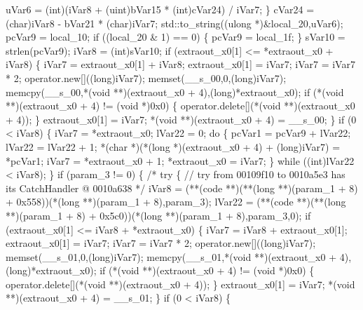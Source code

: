 \documentclass[
]{article}
\newenvironment{Shaded}{}{}
\newcommand{\NormalTok}[1]{#1}
\begin{document}
\begin{Shaded}
\begin{Highlighting}[]
\NormalTok{    uVar6 = (int)(iVar8 + (uint)bVar15 * (int)cVar24) / iVar7;}
\NormalTok{  \}}
\NormalTok{  cVar24 = (char)iVar8 {-} bVar21 * (char)iVar7;}
\NormalTok{  std::to\_string((ulong *)\&local\_20,uVar6);}
\NormalTok{  pcVar9 = local\_10;}
\NormalTok{  if ((local\_20 \& 1) == 0) \{}
\NormalTok{    pcVar9 = local\_1f;}
\NormalTok{  \}}
\NormalTok{  sVar10 = strlen(pcVar9);}
\NormalTok{  iVar8 = (int)sVar10;}
\NormalTok{  if (extraout\_x0[1] \textless{}= *extraout\_x0 + iVar8) \{}
\NormalTok{    iVar7 = extraout\_x0[1] + iVar8;}
\NormalTok{    extraout\_x0[1] = iVar7;}
\NormalTok{    iVar7 = iVar7 * 2;}
\NormalTok{    operator.new[]((long)iVar7);}
\NormalTok{    memset(\_\_s\_00,0,(long)iVar7);}
\NormalTok{    memcpy(\_\_s\_00,*(void **)(extraout\_x0 + 4),(long)*extraout\_x0);}
\NormalTok{    if (*(void **)(extraout\_x0 + 4) != (void *)0x0) \{}
\NormalTok{      operator.delete[](*(void **)(extraout\_x0 + 4));}
\NormalTok{    \}}
\NormalTok{    extraout\_x0[1] = iVar7;}
\NormalTok{    *(void **)(extraout\_x0 + 4) = \_\_s\_00;}
\NormalTok{  \}}
\NormalTok{  if (0 \textless{} iVar8) \{}
\NormalTok{    iVar7 = *extraout\_x0;}
\NormalTok{    lVar22 = 0;}
\NormalTok{    do \{}
\NormalTok{      pcVar1 = pcVar9 + lVar22;}
\NormalTok{      lVar22 = lVar22 + 1;}
\NormalTok{      *(char *)(*(long *)(extraout\_x0 + 4) + (long)iVar7) = *pcVar1;}
\NormalTok{      iVar7 = *extraout\_x0 + 1;}
\NormalTok{      *extraout\_x0 = iVar7;}
\NormalTok{    \} while ((int)lVar22 \textless{} iVar8);}
\NormalTok{  \}}
\NormalTok{  if (param\_3 != 0) \{}
\NormalTok{                    /* try \{ // try from 00109f10 to 0010a5e3 has its CatchHandler @ 0010a638 */}
\NormalTok{    iVar8 = (**(code **)(**(long **)(param\_1 + 8) + 0x558))(*(long **)(param\_1 + 8),param\_3);}
\NormalTok{    lVar22 = (**(code **)(**(long **)(param\_1 + 8) + 0x5c0))(*(long **)(param\_1 + 8),param\_3,0);}
\NormalTok{    if (extraout\_x0[1] \textless{}= iVar8 + *extraout\_x0) \{}
\NormalTok{      iVar7 = iVar8 + extraout\_x0[1];}
\NormalTok{      extraout\_x0[1] = iVar7;}
\NormalTok{      iVar7 = iVar7 * 2;}
\NormalTok{      operator.new[]((long)iVar7);}
\NormalTok{      memset(\_\_s\_01,0,(long)iVar7);}
\NormalTok{      memcpy(\_\_s\_01,*(void **)(extraout\_x0 + 4),(long)*extraout\_x0);}
\NormalTok{      if (*(void **)(extraout\_x0 + 4) != (void *)0x0) \{}
\NormalTok{        operator.delete[](*(void **)(extraout\_x0 + 4));}
\NormalTok{      \}}
\NormalTok{      extraout\_x0[1] = iVar7;}
\NormalTok{      *(void **)(extraout\_x0 + 4) = \_\_s\_01;}
\NormalTok{    \}}
\NormalTok{    if (0 \textless{} iVar8) \{}

\end{Highlighting}
\end{Shaded}
\end{document}
